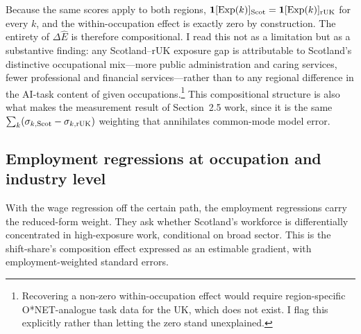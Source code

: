 Because the same scores apply to both regions, $\mathbf{1}[\mathrm{Exp}(k)]_{\mathrm{Scot}}=\mathbf{1}[\mathrm{Exp}(k)]_{\mathrm{rUK}}$ for every $k$, and the within-occupation effect is exactly zero by construction. The entirety of $\Delta\hat E$ is therefore compositional. I read this not as a limitation but as a substantive finding: any Scotland--rUK exposure gap is attributable to Scotland's distinctive occupational mix---more public administration and caring services, fewer professional and financial services---rather than to any regional difference in the AI-task content of given occupations.\footnote{Recovering a non-zero within-occupation effect would require region-specific O*NET-analogue task data for the UK, which does not exist. I flag this explicitly rather than letting the zero stand unexplained.} This compositional structure is also what makes the measurement result of Section~2.5 work, since it is the same $\sum_k(\sigma_{k,\mathrm{Scot}}-\sigma_{k,\mathrm{rUK}})$ weighting that annihilates common-mode model error.

\subsection{Employment regressions at occupation and industry level}

With the wage regression off the certain path, the employment regressions carry the reduced-form weight. They ask whether Scotland's workforce is differentially concentrated in high-exposure work, conditional on broad sector. This is the shift-share's composition effect expressed as an estimable gradient, with employment-weighted standard errors.

